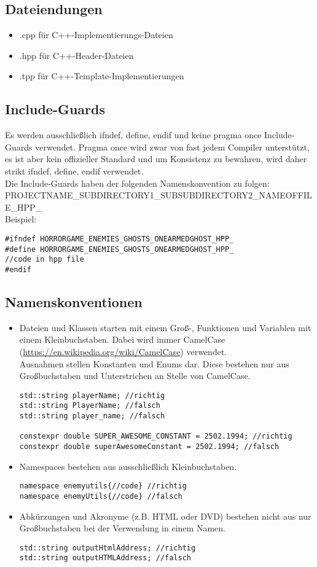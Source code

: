 \documentclass[12pt]{article}
\begin{document}
\subsection{Dateiendungen}
\begin{itemize}
	\item.cpp für C++-Implementierungs-Dateien
	\item.hpp für C++-Header-Dateien
	\item.tpp für C++-Template-Implementierungen
\end{itemize}

\subsection{Include-Guards}
Es werden ausschließlich ifndef, define, endif und keine pragma once Include-Guards verwendet.
Pragma once wird zwar von fast jedem Compiler unterstützt, es ist aber kein offizieller Standard und um Konsistenz zu bewahren, wird daher strikt ifndef, define, endif verwendet.\\
Die Include-Guards haben der folgenden Namenskonvention zu folgen:\\
PROJECTNAME\_SUBDIRECTORY1\_SUBSUBDIRECTORY2\_NAMEOFFILE\_HPP\_\\
Beispiel:
\begin{lstlisting}
#ifndef HORRORGAME_ENEMIES_GHOSTS_ONEARMEDGHOST_HPP_
#define HORRORGAME_ENEMIES_GHOSTS_ONEARMEDGHOST_HPP_
//code in hpp file
#endif
\end{lstlisting}

\subsection{Namenskonventionen}
\begin{itemize}
	\item Dateien und Klassen starten mit einem Groß-, Funktionen und Variablen mit einem Kleinbuchstaben. Dabei wird immer CamelCase (\url{https://en.wikipedia.org/wiki/CamelCase}) verwendet.\\
Ausnahmen stellen Konstanten und Enums dar. Diese bestehen nur aus Großbuchstaben und Unterstrichen an Stelle von CamelCase.
\begin{lstlisting}
std::string playerName; //richtig
std::string PlayerName; //falsch
std::string player_name; //falsch

constexpr double SUPER_AWESOME_CONSTANT = 2502.1994; //richtig
constexpr double superAwesomeConstant = 2502.1994; //falsch
\end{lstlisting}
	\item Namespaces bestehen aus ausschließlich Kleinbuchstaben.
\begin{lstlisting}
namespace enemyutils{//code} //richtig
namespace enemyUtils{//code} //falsch
\end{lstlisting}
	\item Abkürzungen und Akronyme (z.B. HTML oder DVD) bestehen nicht aus nur Großbuchstaben bei der Verwendung in einem Namen.
\begin{lstlisting}
std::string outputHtmlAddress; //richtig
std::string outputHTMLAddress; //falsch
\end{lstlisting}
\end{itemize}
\end{document}
